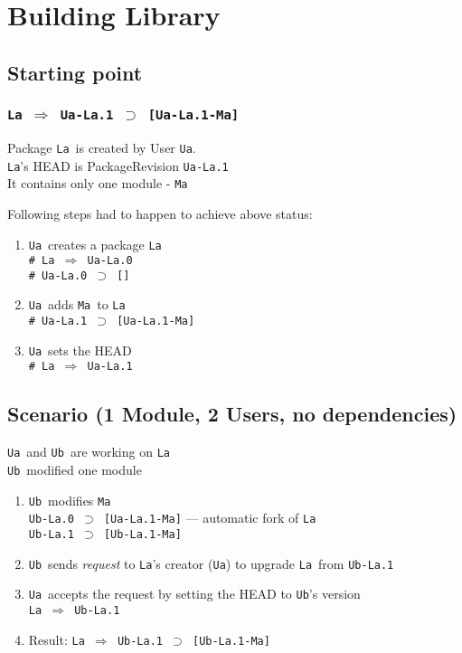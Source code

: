 \documentclass[10pt]{article}
\def\Ua{{\tt Ua}}
\def\Ub{{\tt Ub}}
\def\La{{\tt La}}
\def\Ma{{\tt Ma}}
\def\headsto{${\Longrightarrow}$ }
\def\hto{\headsto}
\def\eq{${\supset}$ }
\begin{document}
\section{Building Library}

	\subsection{Starting point}

		\subsubsection*{{\tt La \hto  Ua-La.1 \eq [Ua-La.1-Ma]}}
			Package \La\ is created by User \Ua.\\
			\La's HEAD is PackageRevision {\tt Ua-La.1}\\
			It contains only one module - \Ma
			
			\noindent Following steps had to happen to achieve above status:
			\begin{enumerate}
				\item{\Ua\ creates a package \La\\
				    {\tt \# La \hto  Ua-La.0} \\
				    {\tt \# Ua-La.0 \eq []}
				}
				\item{\Ua\ adds \Ma\ to \La\\
					{\tt \# Ua-La.1 \eq [Ua-La.1-Ma]}
				}
				\item{\Ua\ sets the HEAD\\
					{\tt \# La \hto  Ua-La.1}
				}
			\end{enumerate}
			
	\subsection{Scenario (1 Module, 2 Users, no dependencies)}
		\Ua\ and \Ub\ are working on \La\\
		\Ub\ modified one module

		\begin{enumerate}
			\item{\Ub\ modifies \Ma\\
            		{\tt Ub-La.0 \eq [Ua-La.1-Ma]} --- automatic fork of \La\\
				{\tt Ub-La.1 \eq [Ub-La.1-Ma]}
			}
			\item{\Ub\ sends {\em request} to \La's creator (\Ua) to upgrade \La\ from {\tt Ub-La.1}}
			\item{\Ua\ accepts the request by setting the HEAD to \Ub's version\\
				{\tt La \hto  Ub-La.1}
			}
			\item{Result: {\tt La \hto  Ub-La.1 \eq [Ub-La.1-Ma]}}
		\end{enumerate}
\end{document}
